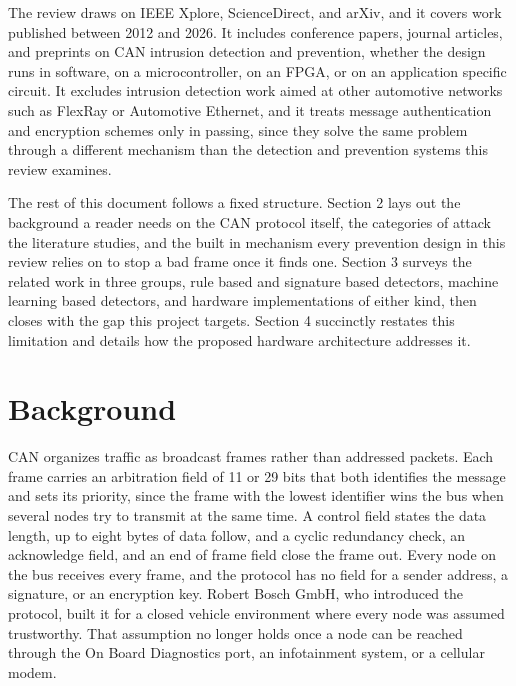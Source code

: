 \documentclass[11pt]{article}
\begin{document}
The review draws on IEEE Xplore, ScienceDirect, and arXiv, and it covers work published between 2012 and 2026. It includes conference papers, journal articles, and preprints on CAN intrusion detection and prevention, whether the design runs in software, on a microcontroller, on an FPGA, or on an application specific circuit. It excludes intrusion detection work aimed at other automotive networks such as FlexRay or Automotive Ethernet, and it treats message authentication and encryption schemes only in passing, since they solve the same problem through a different mechanism than the detection and prevention systems this review examines.

The rest of this document follows a fixed structure. Section 2 lays out the background a reader needs on the CAN protocol itself, the categories of attack the literature studies, and the built in mechanism every prevention design in this review relies on to stop a bad frame once it finds one. Section 3 surveys the related work in three groups, rule based and signature based detectors, machine learning based detectors, and hardware implementations of either kind, then closes with the gap this project targets. Section 4 succinctly restates this limitation and details how the proposed hardware architecture addresses it.

\section{Background}

CAN organizes traffic as broadcast frames rather than addressed packets. Each frame carries an arbitration field of 11 or 29 bits that both identifies the message and sets its priority, since the frame with the lowest identifier wins the bus when several nodes try to transmit at the same time. A control field states the data length, up to eight bytes of data follow, and a cyclic redundancy check, an acknowledge field, and an end of frame field close the frame out. Every node on the bus receives every frame, and the protocol has no field for a sender address, a signature, or an encryption key. Robert Bosch GmbH, who introduced the protocol, built it for a closed vehicle environment where every node was assumed trustworthy. That assumption no longer holds once a node can be reached through the On Board Diagnostics port, an infotainment system, or a cellular modem.
\end{document}
